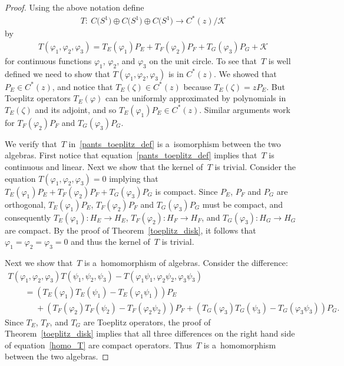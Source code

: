 \begin{proof}
Using the above notation def\/ine
\begin{gather*}
T: \  C\big(S^1\big)\oplus C\big(S^1\big)\oplus C\big(S^1\big) \to C^*(z)/\mathcal{K}
\end{gather*}
by
\begin{gather}
\label{pants_toeplitz_def}
T(\varphi_1,\varphi_2,\varphi_3)=T_E(\varphi_1)P_E+T_F(\varphi_2)P_F+T_G(\varphi_3)P_G+\mathcal{K}
\end{gather}
for continuous functions $\varphi_1$, $\varphi_2$, and $\varphi_3$ on the unit circle.
To see that~$T$ is well def\/ined we need to show that $T(\varphi_1,\varphi_2,\varphi_3)$ is in $C^*(z)$.
We showed that $P_E\in C^*(z)$, and notice that $T_E(\zeta)\in C^*(z)$ because $T_E(\zeta)=zP_E$.
But Toeplitz operators $T_E(\varphi)$ can be uniformly approximated by polynomials in $T_E(\zeta)$ and its adjoint, and
so $T_E(\varphi_1)P_E\in C^*(z)$.
Similar arguments work for $T_F(\varphi_2)P_F$ and $T_G(\varphi_3)P_G$.

We verify that~$T$ in~\eqref{pants_toeplitz_def} is a~isomorphism between the two algebras.
First notice that equation~\eqref{pants_toeplitz_def} implies that~$T$ is continuous and linear.
Next we show that the kernel of~$T$ is trivial.
Consider the equation $T(\varphi_1,\varphi_2,\varphi_3)=0$ implying that $T_E(\varphi_1)P_E+T_F(\varphi_2)P_F+T_G(\varphi_3)P_G$ is compact.
Since $P_E$, $P_F$ and $P_G$ are orthogonal, $T_E(\varphi_1)P_E$, $T_F(\varphi_2)P_F$ and $T_G(\varphi_3)P_G$ must be
compact, and consequently $T_E(\varphi_1):H_E \to H_E$, $T_F(\varphi_2):H_F \to H_F$, and $T_G(\varphi_3):H_G \to H_G$
are compact.
By the proof of Theorem~\ref{toeplitz_disk}, it follows that $\varphi_1=\varphi_2=\varphi_3=0$ and thus the kernel
of~$T$ is trivial.

Next we show that~$T$ is a~homomorphism of algebras.
Consider the dif\/ference:
\begin{gather}
T(\varphi_1,\varphi_2,\varphi_3)T(\psi_1,\psi_2,\psi_3)-T(\varphi_1\psi_1,\varphi_2\psi_2,\varphi_3\psi_3)
\nonumber
\\
\qquad{}
=\left(T_E(\varphi_1)T_E(\psi_1)-T_E(\varphi_1\psi_1)\right)P_E
\nonumber
\\
\qquad
\phantom{=}{}
+\left(T_F(\varphi_2)T_F(\psi_2)-T_F(\varphi_2\psi_2)\right)P_F+\left(T_G(\varphi_3)T_G(\psi_3)-T_G(\varphi_3\psi_3)\right)P_G.
\label{homo_T}
\end{gather}
Since $T_E$, $T_F$, and $T_G$ are Toeplitz operators, the proof of Theorem~\ref{toeplitz_disk} implies that all three
dif\/ferences on the right hand side of equation~\eqref{homo_T} are compact operators.
Thus~$T$ is a~homomorphism between the two algebras.


\end{proof}
